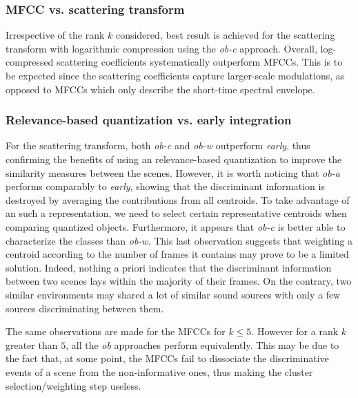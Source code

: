 \documentclass[journal]{IEEEtran}
\makeatletter
\newcommand*{\vs}{vs.\@\xspace}
\makeatother
\begin{document}
\subsubsection*{MFCC \vs scattering transform}

Irrespective of the rank $k$ considered, best result is achieved for the scattering transform with logarithmic compression using the \emph{ob-c} approach. Overall, log-compressed scattering coefficients systematically outperform MFCCs. This is to be expected since the scattering coefficients capture larger-scale modulations, as opposed to MFCCs which only describe the short-time spectral envelope.

\subsubsection*{Relevance-based quantization \vs early integration}

For the scattering transform, both \emph{ob-c} and \emph{ob-w} outperform \emph{early}, thus confirming the benefits of using an relevance-based quantization to improve the similarity measures between the scenes. However, it is worth noticing that \emph{ob-a} performs comparably to \emph{early}, showing that the discriminant information is destroyed by averaging the contributions from all centroids. To take advantage of an such a representation, we need to select certain representative centroids when comparing quantized objects. Furthermore, it appears that \emph{ob-c} is better able to characterize the classes than \emph{ob-w}. This last observation suggests that weighting a centroid according to the number of frames it contains may prove to be a limited solution. Indeed, nothing a priori indicates that the discriminant information between two scenes lays within the majority of their frames. On the contrary, two similar environments may shared a lot of similar sound sources with only a few sources discriminating between them.

The same observations are made for the MFCCs for $k\leq5$. However for a rank $k$ greater than $5$, all the \emph{ob} approaches perform equivalently. This may be due to the fact that, at some point, the MFCCs fail to dissociate the discriminative events of a scene from the non-informative ones, thus making the cluster selection/weighting step useless.
	
\end{document}
